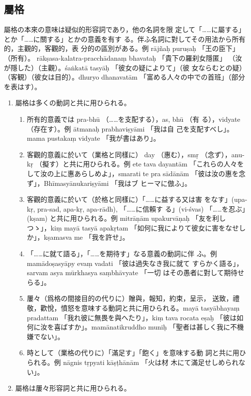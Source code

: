 \subsection{屬格}
\numberParagraph \label{np:229}
屬格の本來の意味は疑似的形容詞であり，他の名詞を限
定して「……に屬する」とか「……に關する」とかの意義を有す
る。伴ふ名詞に對してその用法から所有的，主觀的，客觀的，表
分的の區別がある。例 rājñaḥ puruṣaḥ 「王の臣下」（所有）。
rākṣasa-kalatra-pracchādanaṃ bhavataḥ 「貴下の羅刹女隱匿」
（汝が隱した）（主觀）。śaṅkatā tasyāḥ 「彼女の疑によりて」（彼
女ならむとの疑）（客観）（彼女は目的）。dhuryo dhanavatām
「富める人々の中での首班」（部分を表はす）。
\begin{enumerate}[label=(\arabic*)]
\item 屬格は多くの動詞と共に用ひられる。
\begin{enumerate}[label=(\alph*)]
\item 所有的意義では pra-bhū （……を支配する），as, bhū （有
る），vidyate （存在す）。例 ātmanaḥ prabhaviṣyāmi 「我は自
己を支配すべし」。mama pustakaṃ vidyate 「我が書はあり」。
\item 客觀的意義に於いて（業格と同樣に） day （惠む），smṛ
（念ず），anu-kṛ （擬す）と共に用ひられる。例 ete tava dayantām
「これらの人々をして汝の上に惠あらしめよ」，smarati te pra\-%
sādānām 「彼は汝の惠を念ず」，Bhīmasyānukariṣyāmi 「我はブ
ヒーマに倣ふ」。
\item 客觀的意義に於いて（於格と同樣に）「……に益する又は害
をなす」(upa-kṛ, pra-sad, apa-kṛ, apa-rādh), 「……に信賴す
る」(vi-śvas) 「……を忍ぶ」(kṣam) と共に用ひられる。例
mitrāṇām upakurvāṇaḥ 「友を利しつゝ」，kiṃ mayā tasyā
apakṛtam 「如何に我によりて彼女に害をなせしか」，kṣamasva
me 「我を許せ」。
\item \label{item:229d} 「……に就て語る」，「……を期待す」なる意義の動詞に伴
ふ。例 mamādoṣasyāpy evaṃ vadati 「彼は過失なき我に就て
すらかく語る」，sarvam asya mūrkhasya saṃbhāvyate 「一切
はその愚者に對して期待せらる」。
\item 屢々（爲格の間接目的の代りに）贈與，報知，約束，呈示，
送致，禮敬，歡悅，憤怒を意味する動詞と共に用ひられる。mayā
tasyābhayaṃ pradattam 「我れ彼に無畏を與へたり」，kiṃ tava
rocata eṣaḥ 「彼は如何に汝を喜ばすか」。mamānatikruddho
muniḥ 「聖者は甚しく我に不機嫌でない」。
\item 時として（業格の代りに）「滿足す」「飽く」を意味する動
詞と共に用ひられる。例 nāgnis tṛpyati kāṣṭhānām 「火は材
木にて滿足せしめられない」。
\end{enumerate}
\item 屬格は屢々形容詞と共に用ひられる。

\end{enumerate}
